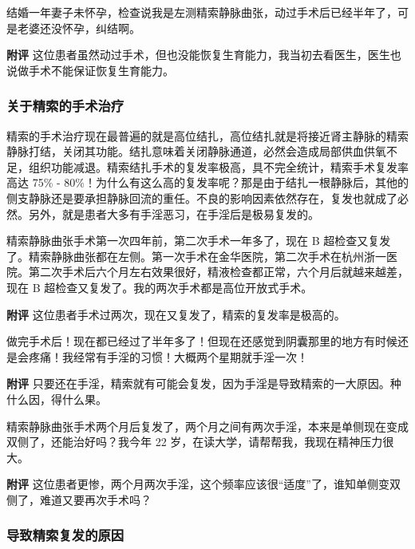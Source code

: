\begin{case}[精索静脉曲张]
    结婚一年妻子未怀孕，检查说我是左测精索静脉曲张，动过手术后已经半年了，可是老婆还没怀孕，纠结啊。

    \textbf{附评} 这位患者虽然动过手术，但也没能恢复生育能力，我当初去看医生，医生也说做手术不能保证恢复生育能力。
\end{case}

\subsubsection{关于精索的手术治疗}

精索的手术治疗现在最普遍的就是高位结扎，高位结扎就是将接近肾主静脉的精索静脉打结，关闭其功能。结扎意味着关闭静脉通道，必然会造成局部供血供氧不足，组织功能减退。精索结扎手术的复发率极高，具不完全统计，精索手术复发率高达 75\% - 80\%！为什么有这么高的复发率呢？那是由于结扎一根静脉后，其他的侧支静脉还是要承担静脉回流的重任。不良的影响因素依然存在，复发也就成了必然。另外，就是患者大多有手淫恶习，在手淫后是极易复发的。

\begin{case}[精索静脉曲张]
    精索静脉曲张手术第一次四年前，第二次手术一年多了，现在 B 超检查又复发了。精索静脉曲张都在左侧。第一次手术在金华医院，第二次手术在杭州浙一医院。第二次手术后六个月左右效果很好，精液检查都正常，六个月后就越来越差，现在 B 超检查又复发了。我的两次手术都是高位开放式手术。

    \textbf{附评} 这位患者手术过两次，现在又复发了，精索的复发率是极高的。
\end{case}

\begin{case}[精索静脉曲张]
    做完手术后！现在都已经过了半年多了！但现在还感觉到阴囊那里的地方有时候还是会疼痛！我经常有手淫的习惯！大概两个星期就手淫一次！

    \textbf{附评} 只要还在手淫，精索就有可能会复发，因为手淫是导致精索的一大原因。种什么因，得什么果。
\end{case}

\begin{case}[精索静脉曲张]
    精索静脉曲张手术两个月后复发了，两个月之间有两次手淫，本来是单侧现在变成双侧了，还能治好吗？我今年 22 岁，在读大学，请帮帮我，我现在精神压力很大。

    \textbf{附评} 这位患者更惨，两个月两次手淫，这个频率应该很“适度”了，谁知单侧变双侧了，难道又要再次手术吗？
\end{case}

\subsubsection{导致精索复发的原因}

